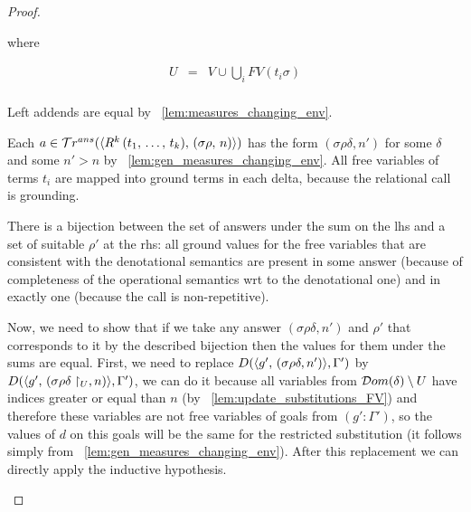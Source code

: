 \begin{proof}
\begin{enumerate}
\begin{enumerate}
    where
    
    \[ \begin{array}{lcl}
    U & = &  V \cup \bigcup_{i} FV(t_i \sigma) \\
    \end{array} \]
    
    Left addends are equal by \lemmaword~\ref{lem:measures_changing_env}.
    
    Each $a \in \mathcal{T}r^{ans}(\langle R^k\,(t_1, \, \dots, \, t_k) ,\, (\sigma\rho ,\, n) \rangle)$ has the form $(\sigma \rho \delta, n')$ for some $\delta$ and some $n' > n$ by \lemmaword~\ref{lem:gen_measures_changing_env}. All free variables of terms $t_i$ are mapped into ground terms in each delta, because the relational call is grounding.
    
    There is a bijection between the set of answers under the sum on the lhs and a set of suitable $\rho'$ at the rhs: all ground values for the free variables that are consistent with the denotational semantics are present in some answer (because of completeness of the operational semantics wrt to the denotational one) and in exactly one (because the call is non-repetitive).
    
    Now, we need to show that if we take any answer $(\sigma \rho \delta, n')$ and $\rho'$ that corresponds to it by the described bijection then the values for them under the sums are equal. First, we need to replace $D(\langle g' ,\, (\sigma \rho \delta, n') \rangle, \Gamma')$ by $D(\langle g' ,\, (\sigma \rho \delta\restriction_U, n) \rangle, \Gamma')$, we can do it because all variables from $\mathcal{D}om(\delta) \setminus U$ have indices greater or equal than $n$ (by \lemmaword~\ref{lem:update_substitutions_FV}) and therefore these variables are not free variables of goals from $(g' : \Gamma')$, so the values of $d$ on this goals will be the same for the restricted substitution (it follows simply from \lemmaword~\ref{lem:gen_measures_changing_env}). After this replacement we can directly apply the inductive hypothesis.
	
	\end{enumerate}


\end{enumerate}
\end{proof}

